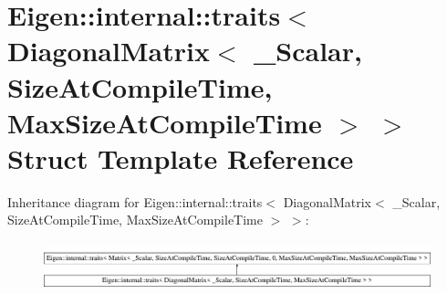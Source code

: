 \hypertarget{struct_eigen_1_1internal_1_1traits_3_01_diagonal_matrix_3_01___scalar_00_01_size_at_compile_timeb0b2868b66e3b20cd28c00acb4409967}{}\section{Eigen\+::internal\+::traits$<$ Diagonal\+Matrix$<$ \+\_\+\+Scalar, Size\+At\+Compile\+Time, Max\+Size\+At\+Compile\+Time $>$ $>$ Struct Template Reference}
\label{struct_eigen_1_1internal_1_1traits_3_01_diagonal_matrix_3_01___scalar_00_01_size_at_compile_timeb0b2868b66e3b20cd28c00acb4409967}
Inheritance diagram for Eigen\+::internal\+::traits$<$ Diagonal\+Matrix$<$ \+\_\+\+Scalar, Size\+At\+Compile\+Time, Max\+Size\+At\+Compile\+Time $>$ $>$\+:\begin{figure}[H]
\begin{center}
\leavevmode
\includegraphics[height=1.421320cm]{struct_eigen_1_1internal_1_1traits_3_01_diagonal_matrix_3_01___scalar_00_01_size_at_compile_timeb0b2868b66e3b20cd28c00acb4409967}
\end{center}
\end{figure}
